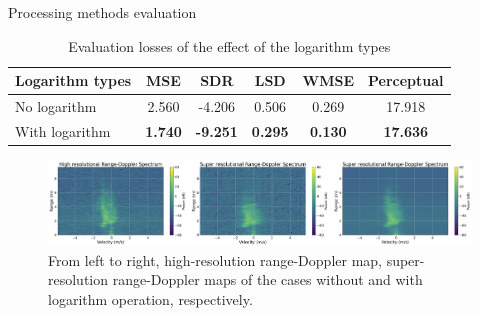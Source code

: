 \documentclass{beamer}
\begin{document}
\begin{frame}{Processing methods evaluation}
    \begin{table}
        \centering
        \caption{Evaluation losses of the effect of the logarithm types}
        \label{Evaluation losses of the logarithm types comparison}
        \vspace{-0.2cm}
        \begin{tabular}{l|c|c|c|c|c}
            \hline
            Logarithm types & MSE & SDR & LSD & WMSE & Perceptual \\
            \hline
            No logarithm & 2.560 & -4.206 & 0.506 & 0.269 & 17.918 \\
            \hline
            With logarithm & \textbf{1.740} & \textbf{-9.251} & \textbf{0.295} & \textbf{0.130} & \textbf{17.636} \\
            \hline
        \end{tabular}
    \end{table}

    \begin{figure}
        \centering
        \includegraphics[scale=.34]{MA_presentation/figures/evaluation_processing_D_new.png}
        \caption{From left to right, high-resolution range-Doppler map, super-resolution range-Doppler maps of the cases without and with logarithm operation, respectively.}
        \label{super-resolution images of the logarithm types}
    \end{figure}
\end{frame}
\end{document}
